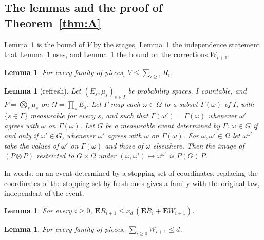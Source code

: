 \documentclass[11pt]{amsart}
\newtheorem{lemma}[theorem]{Lemma}
\theoremstyle{definition}
\numberwithin{equation}{section}
\newcommand{\lean}[1]{\ignorespaces}
\newcommand{\E}{\mathbf{E}}
\begin{document}
\subsection{The lemmas and the proof of Theorem~\ref{thm:A}}
Lemma~\ref{lem:visits} is the bound of $V$ by the stages, Lemma~\ref{lem:refresh} the independence statement that Lemma~\ref{lem:stage} uses, and Lemma~\ref{lem:children} the bound on the corrections $W_{i+1}$.

\begin{lemma}\label{lem:visits}\lean{FrogModel.encard_visits_glue_le, FrogModel.reach_mem_stage, FrogModel.visits_subset}
For every family of pieces, $V\le\sum_{i\ge1}R_i$.
\end{lemma}

\begin{lemma}[refresh]\label{lem:refresh}\lean{FrogModel.Stage.map_refresh, FrogModel.Stage.lintegral_refresh, FrogModel.Stage.IsStoppingSet, FrogModel.Stage.IsDetermined}
Let $(E_s,\mu_s)_{s\in I}$ be probability spaces, $I$ countable, and $P=\bigotimes_s\mu_s$ on $\Omega=\prod_sE_s$. Let $\Gamma$ map each $\omega\in\Omega$ to a subset $\Gamma(\omega)$ of $I$, with $\{s\in \Gamma\}$ measurable for every $s$, and such that $\Gamma(\omega')=\Gamma(\omega)$ whenever $\omega'$ agrees with $\omega$ on $\Gamma(\omega)$. Let $G$ be a measurable event determined by $\Gamma$: $\omega\in G$ if and only if $\omega'\in G$, whenever $\omega'$ agrees with $\omega$ on $\Gamma(\omega)$. For $\omega,\omega'\in\Omega$ let $\omega^{\omega'}$ take the values of $\omega'$ on $\Gamma(\omega)$ and those of $\omega$ elsewhere. Then the image of $(P\otimes P)$ restricted to $G\times\Omega$ under $(\omega,\omega')\mapsto\omega^{\omega'}$ is $P(G)\,P$.
\end{lemma}

In words: on an event determined by a stopping set of coordinates, replacing the coordinates of the stopping set by fresh ones gives a family with the original law, independent of the event.

\begin{lemma}\label{lem:stage}\lean{FrogModel.lemma31, FrogModel.stageR_succ_le, FrogModel.lintegral_enterSet, FrogModel.count_enterSet}
For every $i\ge0$, $\E R_{i+1}\le x_d\,(\E R_i+\E W_{i+1})$.
\end{lemma}

\begin{lemma}\label{lem:children}\lean{FrogModel.sum_stageW_le, FrogModel.child_mem_stage}
For every family of pieces, $\sum_{i\ge0}W_{i+1}\le d$.
\end{lemma}
\end{document}

